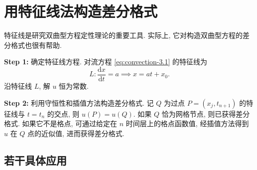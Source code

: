 \section{用特征线法构造差分格式}

特征线是研究双曲型方程定性理论的重要工具. 实际上, 它对构造双曲型方程的差分格式也很有帮助.

\noindent\textbf{Step 1:} 确定特征线方程. 对流方程 \eqref{eq:convection-3.1} 的特征线为
\begin{equation}
    L: \frac{\mathrm{d}x}{\mathrm{d}t} = a \implies x = at + x_0.
\end{equation}
沿特征线 $L$, 解 $u$ 恒为常数.

\noindent\textbf{Step 2:} 利用守恒性和插值方法构造差分格式. 记 $Q$ 为过点 $P=(x_j, t_{n+1})$ 的特征线与 $t=t_n$ 的交点, 则 $u(P)=u(Q)$. 如果 $Q$ 恰为网格节点, 则已获得差分格式. 如果它不是格点, 可通过给定在 $n$ 时间层上的格点函数值, 经插值方法得到 $u$ 在 $Q$ 点的近似值, 进而获得差分格式.

\subsection*{若干具体应用}

